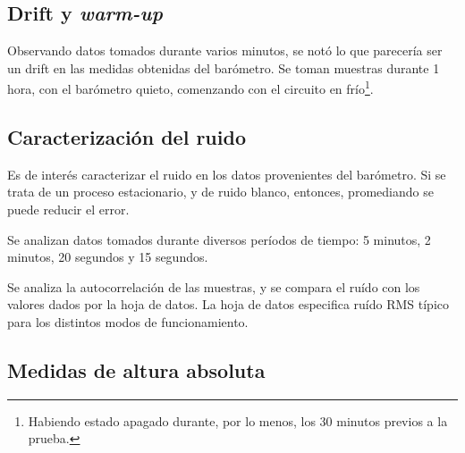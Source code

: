 \documentclass[spanish,12pt,a4paper,titlepage]{report}
\begin{document}
\subsection{Drift y \textit{warm-up}}
\label{sec:drift-y-warm-up}

Observando datos tomados durante varios minutos, se notó lo que parecería ser un drift en las medidas obtenidas del barómetro. Se toman muestras durante 1 hora, con el barómetro quieto, comenzando con el circuito en frío\footnote{Habiendo estado apagado durante, por lo menos, los 30 minutos previos a la prueba.}.

\subsection{Caracterización del ruido}

Es de interés caracterizar el ruido en los datos provenientes del barómetro. Si se trata de un proceso estacionario, y de ruido blanco, entonces, promediando se puede reducir el error.

Se analizan datos tomados durante diversos períodos de tiempo: 5 minutos, 2 minutos, 20 segundos y 15 segundos.

Se analiza la autocorrelación de las muestras, y se compara el ruído con los valores dados por la hoja de datos. La hoja de datos especifica ruído RMS típico para los distintos modos de funcionamiento.

\subsection{Medidas de altura absoluta}
\end{document}
